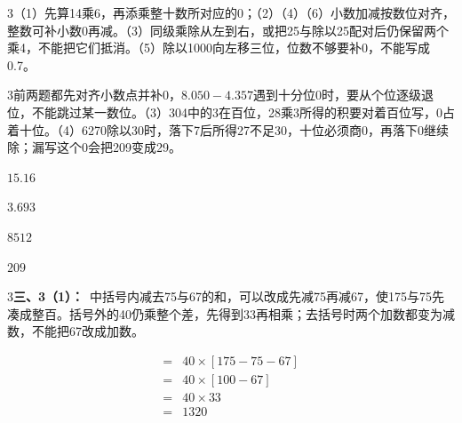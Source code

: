 \documentclass[multi=snippet,border={5bp 20bp 5bp 5bp}]{standalone}
\newenvironment{snippet}[3]{\begin{minipage}{#1bp}\color{answerred}\fontsize{#2}{#3}\selectfont\raggedright}{\end{minipage}}
\begin{document}
\begin{snippet}{505}{11.5}{14}\begin{multicols}{3}\raggedcolumns （1）先算14乘6，再添乘整十数所对应的0；（2）（4）（6）小数加减按数位对齐，整数可补小数0再减。（3）同级乘除从左到右，或把25与除以25配对后仍保留两个乘4，不能把它们抵消。（5）除以1000向左移三位，位数不够要补0，不能写成0.7。\end{multicols}\end{snippet}
\begin{snippet}{505}{11.5}{14}\begin{multicols}{3}\raggedcolumns 前两题都先对齐小数点并补0，\(8.050-4.357\)\allowbreak 遇到十分位0时，要从个位逐级退位，不能跳过某一数位。（3）304中的3在百位，28乘3所得的积要对着百位写，0占着十位。（4）6270除以30时，落下7后所得27不足30，十位必须商0，再落下0继续除；漏写这个0会把209变成29。\end{multicols}\end{snippet}
\begin{snippet}{34.25}{10}{14}\SourceSans\setlength{\mathindent}{2bp}\(15.16\)\end{snippet}
\begin{snippet}{34.25}{10}{14}\SourceSans\setlength{\mathindent}{2bp}\(3.693\)\end{snippet}
\begin{snippet}{34.25}{10}{14}\SourceSans\setlength{\mathindent}{2bp}\(8512\)\end{snippet}
\begin{snippet}{34.25}{10}{14}\SourceSans\setlength{\mathindent}{2bp}\(209\)\end{snippet}
\begin{snippet}{505}{11.5}{14}\begin{multicols}{3}\raggedcolumns \textbf{三、3（1）：}\ 中括号内减去75与67的和，可以改成先减75再减67，使175与75先凑成整百。括号外的40仍乘整个差，先得到33再相乘；去括号时两个加数都变为减数，不能把67改成加数。\end{multicols}\end{snippet}
\begin{snippet}{172.567}{10.5}{12.8}\SourceSans\setlength{\mathindent}{2bp}\[\begin{aligned}={}&40\times[175-75-67]\\={}&40\times[100-67]\\={}&40\times33\\={}&1320\end{aligned}\]\end{snippet}
\end{document}
